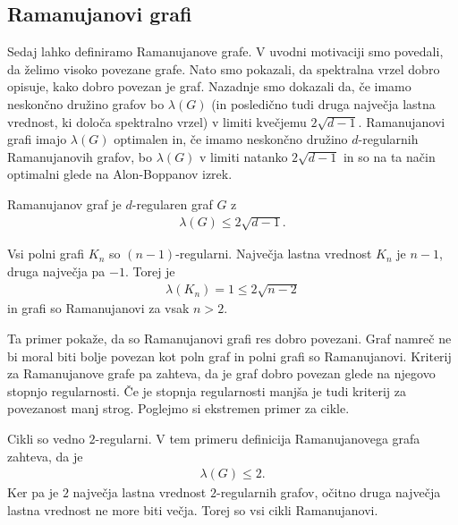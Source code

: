 \subsection{Ramanujanovi grafi}
Sedaj lahko definiramo Ramanujanove grafe. V uvodni motivaciji smo povedali, da želimo visoko povezane grafe. Nato smo pokazali, da spektralna vrzel dobro opisuje, kako dobro povezan je graf. Nazadnje smo dokazali da, če imamo neskončno družino grafov bo \(\lambda(G)\) (in posledično tudi druga največja lastna vrednost, ki določa spektralno vrzel) v limiti kvečjemu \(2\sqrt{d-1}\). Ramanujanovi grafi imajo \(\lambda(G)\) optimalen in, če imamo neskončno družino \(d\)-regularnih Ramanujanovih grafov, bo \(\lambda(G)\) v limiti natanko \(2\sqrt{d-1}\) in so na ta način optimalni glede na Alon-Boppanov izrek.

\begin{definicija}
    Ramanujanov graf je \(d\)-regularen graf \(G\) z
    \begin{align*}
        \lambda(G) \leq 2\sqrt{d-1}.
    \end{align*}
\end{definicija}

\begin{primer}
    Vsi polni grafi \(K_n\) so \((n-1)\)-regularni. Največja lastna vrednost \(K_n\) je \(n-1\), druga največja pa \(-1\). Torej je
    \begin{align*}
        \lambda(K_n) = 1 \leq 2\sqrt{n-2}
    \end{align*}
    in grafi so Ramanujanovi za vsak \(n>2\).
\end{primer}
Ta primer pokaže, da so Ramanujanovi grafi res dobro povezani. Graf namreč ne bi moral biti bolje povezan kot poln graf in polni grafi so Ramanujanovi. Kriterij za Ramanujanove grafe pa zahteva, da je graf dobro povezan glede na njegovo stopnjo regularnosti. Če je stopnja regularnosti manjša je tudi kriterij za povezanost manj strog. Poglejmo si ekstremen primer za cikle.
\begin{primer}[Cikli]
    Cikli so vedno \(2\)-regularni. V tem primeru definicija Ramanujanovega grafa zahteva, da je
    \begin{align*}
        \lambda(G) \leq 2.
    \end{align*}
    Ker pa je \(2\) največja lastna vrednost \(2\)-regularnih grafov, očitno druga največja lastna vrednost ne more biti večja. Torej so vsi cikli Ramanujanovi.
\end{primer}


